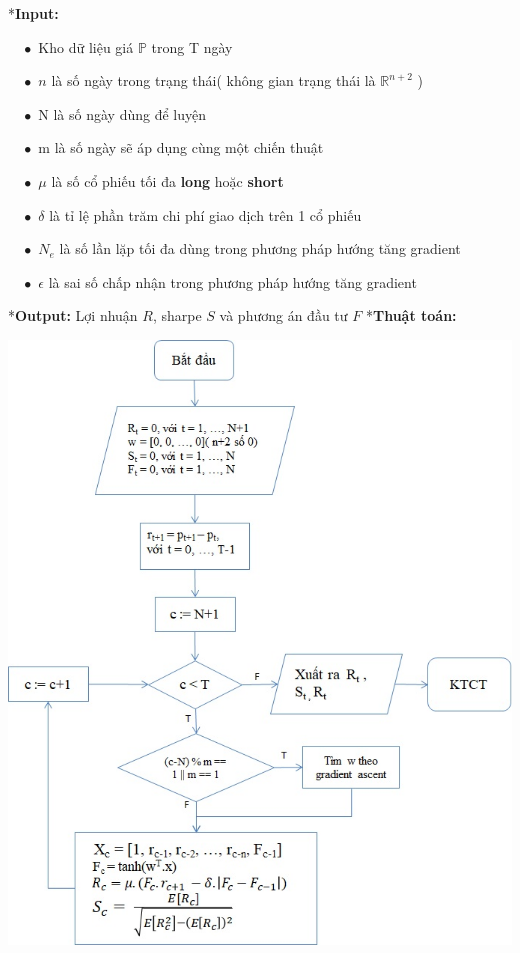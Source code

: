 \documentclass[14pt]{extreport}
\begin{document}
*\textbf{Input: }

$\quad \bullet$ Kho dữ liệu giá $\mathbb{P}$ trong T ngày

$\quad \bullet $ $n$ là số ngày trong trạng thái( không gian trạng thái là $\mathbb{R}^{n+2}$ )

$\quad \bullet $ N là số ngày dùng để luyện

$\quad \bullet $ m là số ngày sẽ áp dụng cùng một chiến thuật

$\quad \bullet $ {\large $\mu$} là số cổ phiếu tối đa \textbf{long} hoặc \textbf{short} 

$\quad \bullet $ {\large $\delta$} là tỉ lệ phần trăm chi phí giao dịch trên 1 cổ phiếu 

$\quad \bullet $ $N_e$ là số lần lặp tối đa dùng trong phương pháp hướng tăng gradient

$\quad \bullet $ {\large $\epsilon$} là sai số chấp nhận trong phương pháp hướng tăng gradient

*\textbf{Output: } Lợi nhuận $\mathit{R}$, sharpe $\mathit{S}$ và phương án đầu tư $\mathit{F}$ 
\newpage
*\textbf{Thuật toán: }

\begin{center}
\includegraphics[scale=0.9]{Thuat_toan.jpg}
\end{center}
\end{document}
